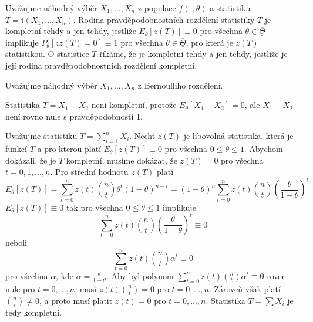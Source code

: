 \begin{definition}
Uvažujme náhodný výběr $X_1, ..., X_n$ z populace $f(\cdot, \theta)$ a statistiku $T = \mathfrak{t}(X_1, ..., X_n)$. Rodina pravděpodobnostních rozdělení statistiky $T$ je kompletní tehdy a jen tehdy, jestliže $E_{\theta}[\mathit{z}(T)] \equiv 0$ pro všechna $\theta \in \overline{\underline{\Theta}}$ implikuje $P_{\theta}[\mathit{z}z(T) = 0] \equiv 1$ pro všechna $\theta \in \overline{\underline{\Theta}}$, pro která je $\mathit{z}(T)$ statistikou. O statistice $T$ říkáme, že je kompletní tehdy a jen tehdy, jestliže je její rodina pravděpodobnostních rozdělení kompletní.
\end{definition}

\begin{example}
Uvažujme náhodný výběr $X_1, ..., X_n$ z Bernoulliho rozdělení.

Statistika $T = X_1 - X_2$ není kompletní, protože $E_{\theta}[X_1 - X_2] = 0$, ale $X_1 - X_2$ není rovno nule s pravděpodobností 1.

Uvažujme statistiku $T = \sum_{i = 1}^n X_i$. Nechť $\mathit{z}(T)$ je libovolná statistika, která je funkcí $T$ a pro kterou platí $E_{\theta}[z(T)] \equiv 0$ pro všechna $0 \le \theta \le 1$. Abychom dokázali, že je $T$ kompletní, musíme dokázat, že $\mathit{z}(T) = 0$ pro všechna $t = 0, 1, ..., n$. Pro střední hodnotu $\mathit{z}(T)$ platí
\begin{equation*}
E_{\theta}[z(T)] = \sum_{t = 0}^n z(t) \binom{n}{t}\theta^t(1 - \theta)^{n - t} = (1 - \theta)^n \sum_{t = 0}^n z(t)\binom{n}{t}\left(\frac{\theta}{1 - \theta}\right)^t
\end{equation*}
$E_{\theta}[\mathit{z}(T)] \equiv 0$ tak pro všechna $0 \le \theta \le 1$ implikuje
\begin{equation*}
\sum_{t = 0}^n \mathit{z}(t) \binom{n}{t} \left(\frac{\theta}{1 - \theta}\right)^t \equiv 0
\end{equation*}
neboli
\begin{equation*}
\sum_{t = 0}^n \mathit{z}(t) \binom{n}{t} \alpha^t \equiv 0
\end{equation*}
pro všechna $\alpha$, kde $\alpha = \frac{\theta}{1 - \theta}$. Aby byl polynom $\sum_{t = 0}^n \mathit{z}(t) \binom{n}{t} \alpha^t \equiv 0$ roven nule pro $t = 0, ..., n$, musí $\mathit{z}(t)\binom{n}{t} = 0$ pro $t = 0, ..., n$. Zároveň však platí $\binom{n}{t} \neq 0$, a proto musí platit $\mathit{z}(t) = 0$ pro $t = 0, ..., n$. Statistika $T = \sum X_i$ je tedy kompletní.
\end{example}

